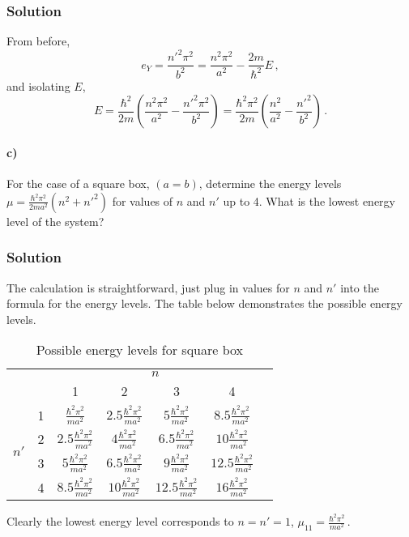 \documentclass[letterpaper,10pt]{article}
\def\enoo{$\frac{\hbar^2\pi^2}{ma^2}$}
\def\enot{$2.5\frac{\hbar^2\pi^2}{ma^2}$}
\def\enoth{$5\frac{\hbar^2\pi^2}{ma^2}$}
\def\enof{$8.5\frac{\hbar^2\pi^2}{ma^2}$}
\def\entt{$4\frac{\hbar^2\pi^2}{ma^2}$}
\def\entth{$6.5\frac{\hbar^2\pi^2}{ma^2}$}
\def\entf{$10\frac{\hbar^2\pi^2}{ma^2}$}
\def\enthth{$9\frac{\hbar^2\pi^2}{ma^2}$}
\def\enthf{$12.5\frac{\hbar^2\pi^2}{ma^2}$}
\def\enff{$16\frac{\hbar^2\pi^2}{ma^2}$}
\begin{document}
\subsubsection*{Solution}
From before,
\[
e_Y=\frac{n'^2\pi^2}{b^2}=\frac{n^2\pi^2}{a^2}-\frac{2m}{\hbar^2}E\,,
\]
and isolating $E$,
\[
E=\frac{\hbar^2}{2m}\left(\frac{n^2\pi^2}{a^2}-\frac{{n'}^2\pi^2}{b^2}\right)
=\frac{\hbar^2\pi^2}{2m}\left(\frac{n^2}{a^2}-\frac{{n'}^2}{b^2}\right)\,.
\]
\paragraph*{c)} For the case of a square box, $(a=b)$, determine the energy
levels
$\displaystyle\mu=\frac{\hbar^2\pi^2}{2ma^2}(n^2+{n'}^2)$ for values of $n$ and
$n'$ up to 4. What is the lowest energy level of the system?
\subsubsection*{Solution}
The calculation is straightforward, just plug in values for $n$ and $n'$ into
the formula for the energy levels. The table below demonstrates the possible
energy levels.
\begin{table*}[h]
\begin{center}
\caption{Possible energy levels for square box}
\begin{tabular}{cc|c|c|c|c|l}
\cline{3-6}
& & \multicolumn{4}{|c|}{$n$} \\ \cline{3-6}
& & 1 & 2 & 3 & 4 \\ \cline{1-6}
\multicolumn{1}{|c|}{\multirow{4}{*}{$n'$}} &
\multicolumn{1}{|c|}{1} & \enoo & \enot & \enoth & \enof &     \\ \cline{2-6}
\multicolumn{1}{|c|}{}                        &
\multicolumn{1}{|c|}{2} & \enot & \entt & \entth & \entf &     \\ \cline{2-6}
\multicolumn{1}{|c|}{}                        &
\multicolumn{1}{|c|}{3} & \enoth & \entth & \enthth & \enthf &  \\ \cline{2-6}
\multicolumn{1}{|c|}{}                        &
\multicolumn{1}{|c|}{4} & \enof & \entf & \enthf & \enff &     \\ \cline{1-6}
\end{tabular}
\end{center}
\end{table*}
Clearly the lowest energy level corresponds to $n=n'=1$,
$\displaystyle
\mu_{11}=\frac{\hbar^2\pi^2}{ma^2}\,.
$
\end{document}
